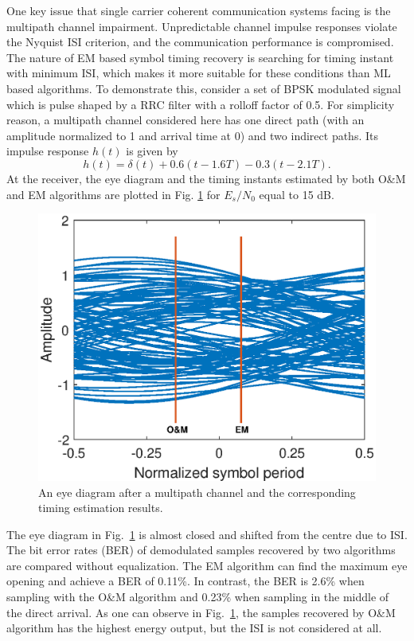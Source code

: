 \documentclass[journal,comsoc, onecolumn, 12pt,draftclsnofoot]{IEEEtran} %
\begin{document}
One key issue that single carrier coherent communication systems facing is the multipath channel impairment.
Unpredictable channel impulse responses violate the Nyquist ISI criterion, and the communication performance is compromised.
The nature of EM based symbol timing recovery is searching for timing instant with minimum ISI, which makes it more suitable for these conditions than ML based algorithms.
To demonstrate this, consider a set of BPSK modulated signal which is pulse shaped by a RRC filter with  a rolloff factor of 0.5.
For simplicity reason, a multipath channel considered here has one direct path (with an amplitude normalized to 1 and arrival time at 0) and two indirect paths.
Its impulse response $h(t)$ is given by
\begin{equation}
h(t)=\delta(t)+0.6(t-1.6T)-0.3(t-2.1T).
\label{eq:multi_path}
\end{equation}
At the receiver, the eye diagram and the timing instants estimated by both O\&M and EM algorithms are plotted in Fig. \ref{fig:per_timing_isi} for \(E_s/N_0\) equal to 15 dB. 
\begin{figure}[ht]
\centering
\includegraphics[width=3 in]{pic/per_timing_multi.eps}
\caption{An eye diagram after a multipath channel and the corresponding timing estimation results.}
\label{fig:per_timing_isi} 
\end{figure} 

The eye diagram in Fig.~\ref{fig:per_timing_isi} is almost closed and shifted from the centre due to ISI.
The bit error rates (BER) of demodulated samples recovered by two algorithms are compared without equalization.
The EM algorithm can find the maximum eye opening and achieve a BER of 0.11\%.
In contrast, the BER is 2.6\% when sampling with the O\&M algorithm and 0.23\% when sampling in the middle of the direct arrival.
As one can observe in Fig.~\ref{fig:per_timing_isi}, the samples recovered by O\&M algorithm has the highest energy output, but the ISI is not considered at all.
\end{document}
